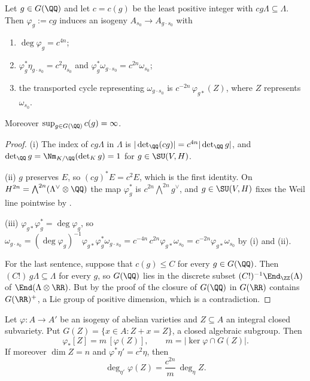 \begin{lemma}\label{lem:transport}
Let $g\in G(\QQ)$ and let $c=c(g)$ be the least positive integer with
$cg\Lambda\subseteq\Lambda$. Then $\varphi_{g}:=cg$ induces an isogeny
$A_{s_{0}}\to A_{g\cdot s_{0}}$ with
\begin{enumerate}[label=\textup{(\roman*)},nosep,leftmargin=2.6em]
\item $\deg\varphi_{g}=c^{4n}$;
\item $\varphi_{g}^{*}\eta_{g\cdot s_{0}}=c^{2}\eta_{s_{0}}$ and
  $\varphi_{g}^{*}\omega_{g\cdot s_{0}}=c^{2n}\omega_{s_{0}}$;
\item the transported cycle representing $\omega_{g\cdot s_{0}}$ is
  $c^{-2n}\,\varphi_{g*}(Z)$, where $Z$ represents $\omega_{s_{0}}$.
\end{enumerate}
Moreover $\sup_{g\in G(\QQ)}c(g)=\infty$.
\end{lemma}

\begin{proof}
(i) The index of $cg\Lambda$ in $\Lambda$ is $|\det_{\QQ}(cg)|
=c^{4n}|\det_{\QQ}g|$, and $\det_{\QQ}g=\Nm_{K/\QQ}(\det_{K}g)=1$ for
$g\in\SU(V,H)$.

(ii) $g$ preserves $E$, so $(cg)^{*}E=c^{2}E$, which is the first identity.
On $H^{2n}=\bigwedge^{2n}(\Lambda^{\vee}\otimes\QQ)$ the map
$\varphi_{g}^{*}$ is $c^{2n}\bigwedge^{2n}g^{\vee}$, and $g\in\SU(V,H)$ fixes
the Weil line pointwise by .

(iii) $\varphi_{g*}\varphi_{g}^{*}=\deg\varphi_{g}$, so
$\omega_{g\cdot s_{0}}=(\deg\varphi_{g})^{-1}\varphi_{g*}
\varphi_{g}^{*}\omega_{g\cdot s_{0}}
=c^{-4n}\,c^{2n}\varphi_{g*}\omega_{s_{0}}=c^{-2n}\varphi_{g*}\omega_{s_{0}}$
by (i) and (ii).

For the last sentence, suppose that $c(g)\le C$ for every $g\in G(\QQ)$.
Then $(C!)\,g\Lambda\subseteq\Lambda$ for every $g$, so $G(\QQ)$ lies in the
discrete subset $(C!)^{-1}\End_{\ZZ}(\Lambda)$ of $\End(\Lambda\otimes\RR)$.
But by the proof of  the closure of $G(\QQ)$ in $G(\RR)$
contains $G(\RR)^{+}$, a Lie group of positive dimension, which is a
contradiction.
\end{proof}

\begin{lemma}
\label{lem:multiplicity}
Let $\varphi\colon A\to A'$ be an isogeny of abelian varieties and $Z\subseteq A$
an integral closed subvariety. Put
$G(Z)=\{x\in A:Z+x=Z\}$, a closed algebraic subgroup. Then
\[
  \varphi_{*}[Z]=m\,[\varphi(Z)],\qquad
  m=\bigl|\ker\varphi\cap G(Z)\bigr| .
\]
If moreover $\dim Z=n$ and $\varphi^{*}\eta'=c^{2}\eta$, then
\[
  \deg_{\eta'}\varphi(Z)=\frac{c^{2n}}{m}\,\deg_{\eta}Z .
\]
\end{lemma}

